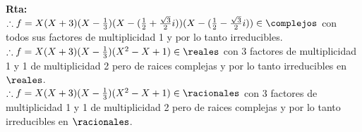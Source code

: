\textbf{Rta:}\\
$\therefore f = X(X+3)( X - \frac{1}{3} )( X - (\frac{1}{2} + \frac{\sqrt 3}{2}i) )( X - (\frac{1}{2} - \frac{\sqrt 3}{2}i) ) \in \complejos$ con todos sus factores de multiplicidad 1 y por lo tanto irreducibles. \\
$\therefore f = X(X+3)( X - \frac{1}{3} )(X^2-X+1) \in \reales$ con 3 factores de multiplicidad 1 y 1 de multiplicidad 2 pero de raices complejas y por lo tanto irreducibles en $\reales$. \\
$\therefore f = X(X+3)( X - \frac{1}{3} )(X^2-X+1) \in \racionales$ con 3 factores de multiplicidad 1 y 1 de multiplicidad 2 pero de raices complejas y por lo tanto irreducibles en $\racionales$. \\












